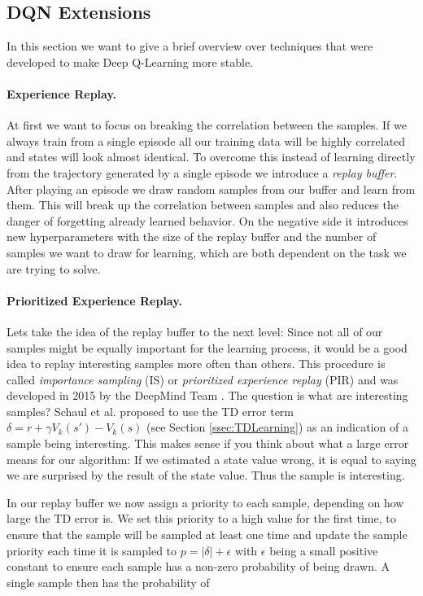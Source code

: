 \subsection{DQN Extensions} \label{ssec:DQNExtensions}
In this section we want to give a brief overview over techniques that were developed to make Deep Q-Learning more stable. 

\paragraph{Experience Replay.}
At first we want to focus on breaking the correlation between the samples. If we always train from a single episode all our training data will be highly correlated and states will look almost identical. To overcome this instead of learning directly from the trajectory generated by a single episode we introduce a \textit{replay buffer}. After playing an episode we draw random samples from our buffer and learn from them. This will break up the correlation between samples and also reduces the danger of forgetting already learned behavior. On the negative side it introduces new hyperparameters with the size of the replay buffer and the number of samples we want to draw for learning, which are both dependent on the task we are trying to solve. 

\paragraph{Prioritized Experience Replay.}
Lets take the idea of the replay buffer to the next level: Since not all of our samples might be equally important for the learning process, it would be a good idea to replay interesting samples more often than others. This procedure is called \textit{importance sampling} (IS) or \textit{prioritized experience replay} (PIR) and was developed in 2015 by the DeepMind Team \cite{schaul2015prioritized}. The question is what are interesting samples? Schaul et al. proposed to use the TD error term $\delta = r+\gamma V_k(s') - V_k(s)$ (see Section \ref{ssec:TDLearning}) as an indication of a sample being interesting. This makes sense if you think about what a large error means for our algorithm: If we estimated a state value wrong, it is equal to saying we are surprised by the result of the state value. Thus the sample is interesting.

In our replay buffer we now assign a priority to each sample, depending on how large the TD error is. We set this priority to a high value for the first time, to ensure that the sample will be sampled at least one time and update the sample priority each time it is sampled to $p = |\delta| + \epsilon$ with $\epsilon$ being a small positive constant to ensure each sample has a non-zero probability of being drawn. A single sample then has the probability of 

